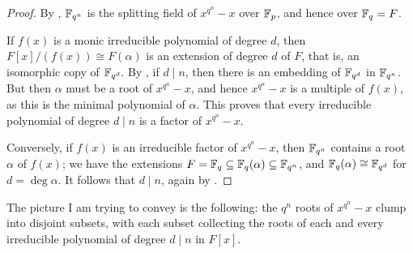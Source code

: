 \begin{proof}
  By , $\mathbb{F}_{q^n}$ is the splitting field of
  $x^{q^n} - x$ over $\mathbb{F}_p$, and hence over $\mathbb{F}_q = F$.

  If $f(x)$ is a monic irreducible polynomial of degree $d$, then
  $F[x]/(f(x)) \cong F(\alpha)$ is an extension of degree $d$ of $F$,
  that is, an isomorphic copy of $\mathbb{F}_{q^d}$. By
  , if $d \mid n$, then there is an embedding of
  $\mathbb{F}_{q^d}$ in $\mathbb{F}_{q^n}$. But then $\alpha$ must be a root of
  $x^{q^n} - x$, and hence $x^{q^n} - x$ is a multiple of $f(x)$, as
  this is the minimal polynomial of $\alpha$. This proves that every
  irreducible polynomial of degree $d \mid n$ is a factor of
  $x^{q^n} - x$.

  Conversely, if $f(x)$ is an irreducible factor of $x^{q^n} - x$,
  then $\mathbb{F}_{q^n}$ contains a root $\alpha$ of $f(x)$; we have the
  extensions $F = \mathbb{F}_q \subseteq \mathbb{F}_q(\alpha) \subseteq \mathbb{F}_{q^n}$, and
  $\mathbb{F}_q(\alpha) \cong \mathbb{F}_{q^d}$ for $d = \deg \alpha$. It follows that
  $d \mid n$, again by .
\end{proof}
The picture I am trying to convey is the following: the $q^n$ roots of
$x^{q^n} - x$ clump into disjoint subsets, with each subset collecting
the roots of each and every irreducible polynomial of degree
$d \mid n$ in $F[x]$.
